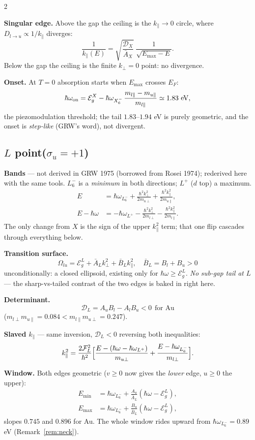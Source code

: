 \documentclass[11pt,a4paper]{article}
\numberwithin{equation}{section}
\newcommand{\hw}{\hbar\omega}
\newcommand{\EgX}{\mathcal{E}_g^{X}}
\newcommand{\EgL}{\mathcal{E}_g^{L}}
\newcommand{\cD}{\mathcal{D}}
\newcommand{\cF}{\mathcal{F}}
\newcommand{\Ab}{\bar{A}}
\newcommand{\Bb}{\bar{B}}
\newcommand{\kperp}{k_{\perp}}
\newcommand{\kpar}{k_{\parallel}}
\newcommand{\Dlu}{D_{l\to u}}
\newcommand{\wXu}{\hbar\omega_{X_6^-}}
\newcommand{\wLu}{\hbar\omega_{L_6^-}}
\newcommand{\wLl}{\hbar\omega_{L^+}}
\begin{document}
\begin{paracol}{2}
\begin{leftcolumn}
\textbf{Singular edge.}  Above the gap the ceiling is the
$\kpar\to0$ circle, where $\Dlu\propto1/\kpar$ diverges:
\[
\frac{1}{\kpar(E)}=\sqrt{\frac{\cD_X}{\Ab_X}}\;
\frac{1}{\sqrt{E_{\max}-E}} .
\]
Below the gap the ceiling is the finite $\kperp=0$ point: no
divergence.

\textbf{Onset.}  At $T=0$ absorption starts when $E_{\max}$ crosses
$E_F$:
\[
\hw_{\rm on}=\EgX-\wXu\,\frac{m_{l\parallel}-m_{u\parallel}}
{m_{l\parallel}}\simeq1.83\ \text{eV},
\]
the piezomodulation threshold; the tail $1.83$--$1.94$ eV is purely
geometric, and the onset is \emph{step-like} (GRW's word), not
divergent.
\end{leftcolumn}

\begin{rightcolumn}
\subsection*{$L$ point\quad ($\sigma_u=+1$)}

\textbf{Bands} --- not derived in GRW 1975 (borrowed from Rosei 1974);
rederived here with the same tools.  $L_6^-$ is a \emph{minimum} in
both directions; $L^+$ ($d$ top) a maximum.
\begin{align*}
E&=\wLu+\frac{\hbar^2\kperp^2}{2m_{u\perp}}
      +\frac{\hbar^2\kpar^2}{2m_{u\parallel}},\\
E-\hw&=-\wLl-\frac{\hbar^2\kperp^2}{2m_{l\perp}}
      -\frac{\hbar^2\kpar^2}{2m_{l\parallel}} .
\end{align*}
The only change from $X$ is the sign of the upper $\kpar^2$ term; that
one flip cascades through everything below.

\textbf{Transition surface.}
\[
\Omega_{lu}=\EgL+\Ab_L\kperp^2+\Bb_L\kpar^2,\quad
\Bb_L=B_l+B_u>0
\]
unconditionally: a closed ellipsoid, existing only for $\hw\ge\EgL$.
\emph{No sub-gap tail at $L$} --- the sharp-vs-tailed contrast of the
two edges is baked in right here.

\textbf{Determinant.}
\[
\cD_L=A_uB_l-A_lB_u<0\ \ \text{for Au}
\]
($m_{l\perp}m_{u\parallel}=0.084<m_{l\parallel}m_{u\perp}=0.247$).

\textbf{Slaved $\kpar$} --- same inversion, $\cD_L<0$ reversing both
inequalities:
\[
\kpar^{2}
=\frac{2\cF_L^{2}}{\hbar^{2}}\Bigl[
\frac{E-(\hw-\wLl)}{m_{u\perp}}
+\frac{E-\wLu}{m_{l\perp}}\Bigr].
\]

\textbf{Window.}  Both edges geometric ($v\ge0$ now gives the
\emph{lower} edge, $u\ge0$ the upper):
\begin{align*}
E_{\min}&=\wLu+\frac{A_u}{\Ab_L}(\hw-\EgL),\\
E_{\max}&=\wLu+\frac{B_u}{\Bb_L}(\hw-\EgL),
\end{align*}
slopes $0.745$ and $0.896$ for Au.  The whole window rides upward from
$\wLu=0.89$ eV (Remark~\ref{rem:neck}).


\end{rightcolumn}
\end{paracol}
\end{document}
